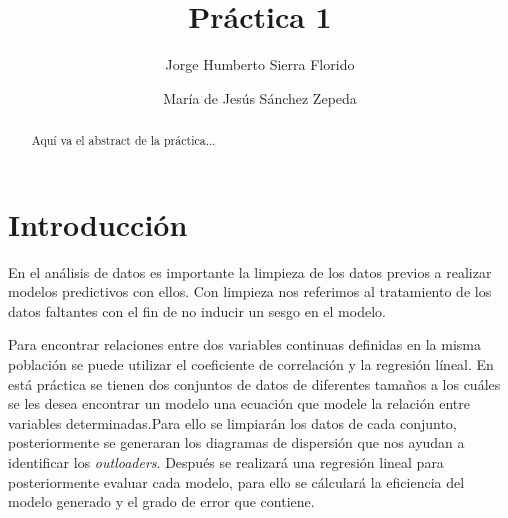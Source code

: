\documentclass[sigconf]{acmart}
\begin{document}
\title{Práctica 1}

\author{Jorge Humberto Sierra Florido}

\author{María de Jesús Sánchez Zepeda}






\begin{abstract}
  Aqu{\'i} va el abstract de la pr{\'a}ctica...
\end{abstract}




\maketitle

\section{Introducción}

En el análisis de datos es importante la limpieza de los datos previos a realizar modelos predictivos con ellos. Con limpieza nos referimos al tratamiento de los datos faltantes con el fin de no inducir un sesgo en el modelo.

Para encontrar relaciones entre dos variables continuas definidas en la misma población se puede utilizar el coeficiente de correlación y la regresión líneal. En está práctica se tienen dos conjuntos de datos de diferentes tamaños a los cuáles se les desea encontrar un modelo una ecuación que modele la relación entre variables determinadas.Para ello se limpiarán los datos de cada conjunto, posteriormente se generaran los diagramas de dispersión que nos ayudan a identificar los \textit{outloaders}. Después se realizará una regresión lineal para posteriormente evaluar cada modelo, para ello se cálculará la eficiencia del modelo generado y el grado de error que contiene.
\end{document}
